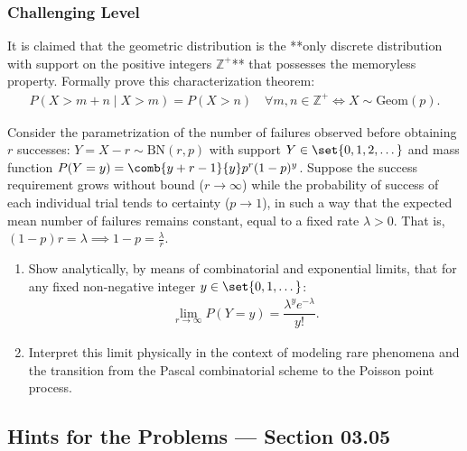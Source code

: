 \subsubsection*{Challenging Level}

\begin{problema}
	\label{prob:3.5.9}
	It is claimed that the geometric distribution is the **only discrete distribution with support on the positive integers $\mathbb{Z}^+$** that possesses the memoryless property. Formally prove this characterization theorem:
	\begin{align*}
		P(X > m+n \mid X > m) = P(X > n) \quad \forall m, n \in \mathbb{Z}^+ \iff X \sim \text{Geom}(p).
	\end{align*}
\end{problema}

\begin{problema}
	\label{prob:3.5.10}
	Consider the parametrization of the number of failures observed before obtaining $r$ successes: $Y = X - r \sim \text{BN}(r, p)$ with support $Y \in \set{0, 1, 2, \dots}$ and mass function $P(Y = y) = \comb{y+r-1}{y} p^r (1-p)^y$. Suppose the success requirement grows without bound ($r \to \infty$) while the probability of success of each individual trial tends to certainty ($p \to 1$), in such a way that the expected mean number of failures remains constant, equal to a fixed rate $\lambda > 0$. That is, $(1-p)r = \lambda \implies 1-p = \frac{\lambda}{r}$.
	\begin{enumerate}
		\item Show analytically, by means of combinatorial and exponential limits, that for any fixed non-negative integer $y \in \set{0, 1, \dots}$:
		\begin{align*}
			\lim_{r \to \infty} P(Y = y) = \dfrac{\lambda^y e^{-\lambda}}{y!}.
		\end{align*}
		\item Interpret this limit physically in the context of modeling rare phenomena and the transition from the Pascal combinatorial scheme to the Poisson point process.
	\end{enumerate}
\end{problema}


\subsection*{Hints for the Problems --- Section 03.05}

